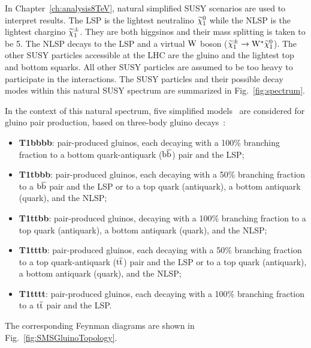 In Chapter~\ref{ch:analysis8TeV}, natural simplified SUSY scenarios are used to interpret
results. The LSP is the lightest neutralino $\widetilde{\chi}^{0}_1$ while the NLSP
is the lightest chargino $\widetilde{\chi}^{\pm}_1$.  They are both higgsinos and
their mass splitting is taken to be 5\GeV. The NLSP decays to the LSP
and a virtual $\mathrm{W}$ boson ($\widetilde{\chi}^{\pm}_1 \to \mathrm{W}^{\ast} \widetilde{\chi}^{0}_1$). The
other SUSY particles accessible at the LHC are the gluino and the
lightest top and bottom squarks. All other SUSY particles are
assumed to be too heavy to participate in the interactions. The SUSY
particles and their possible decay modes within this natural SUSY
spectrum are summarized in Fig.~\ref{fig:spectrum}.

In the context of this natural spectrum, five simplified
models~\cite{ArkaniHamed:2007fw,Alwall:2008ag,Alwall:2008va,Alves:2011sq,Alves:2011wf,Graesser:2012qy}
are considered for gluino pair production, based on three-body gluino decays~\cite{SUS-11-016}:
\begin{itemize}
\item \textbf{ T1bbbb}: pair-produced gluinos, each decaying with a 100\%
 branching fraction to a bottom quark-antiquark ($\mathrm{b}\overline{\mathrm{b}}$) pair and the LSP;
\item \textbf{ T1tbbb}: pair-produced gluinos, each decaying with a
 50\% branching fraction to a $\mathrm{b}\overline{\mathrm{b}}$ pair and the LSP or to a
 top quark (antiquark), a bottom antiquark (quark), and the NLSP;
\item \textbf{ T1ttbb}: pair-produced gluinos, decaying with a 100\%
  branching fraction to a top quark (antiquark), a bottom antiquark (quark), and the NLSP;
\item \textbf{ T1tttb}: pair-produced gluinos, each decaying with a
 50\% branching fraction to a top quark-antiquark ($\mathrm{t}\overline{\mathrm{t}}$) pair and the LSP or to a top
 quark (antiquark), a bottom antiquark (quark), and the NLSP;
\item \textbf{ T1tttt}: pair-produced gluinos, each decaying with a 100\%
 branching fraction to a $\mathrm{t}\overline{\mathrm{t}}$ pair and the LSP.
\end{itemize}
The corresponding Feynman diagrams are shown in Fig.~\ref{fig:SMSGluinoTopology}.

